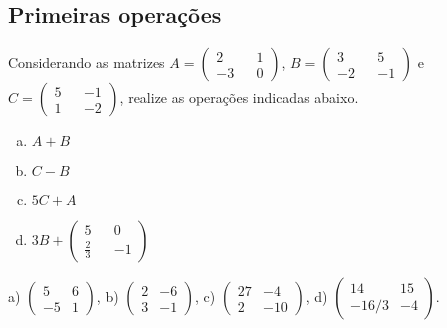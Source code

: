 \documentclass[main_estudante.tex]{subfiles}
\begin{document}
\subsection*{Primeiras operações}
\begin{questao}
Considerando as matrizes $A=\begin{pmatrix} 2 && 1 \\ -3 && 0 \end{pmatrix}$, $B=\begin{pmatrix} 3 && 5 \\ -2 && -1 \end{pmatrix}$ e $C=\begin{pmatrix} 5 && -1 \\ 1 && -2 \end{pmatrix}$, realize as operações indicadas abaixo.
\begin{enumerate}[a)]
\item $A+B$
\item $C-B$
\item $5C+A$
\item $3B+\begin{pmatrix} 5 && 0 \\ \frac{2}{3} && -1 \end{pmatrix}$
\end{enumerate}

\end{questao}

\begin{gabarito}
	\begin{gabaritoQuestao}
		a) $\begin{pmatrix} 5 & 6 \\ -5 & 1\end{pmatrix}$, b) $\begin{pmatrix} 2 & -6 \\ 3 & -1\end{pmatrix}$, c) $\begin{pmatrix} 27 & -4 \\ 2 & -10\end{pmatrix}$, d) $\begin{pmatrix} 14 & 15 \\ -16/3 & -4\end{pmatrix}$.
	\end{gabaritoQuestao}
\end{gabarito}
\end{document}

